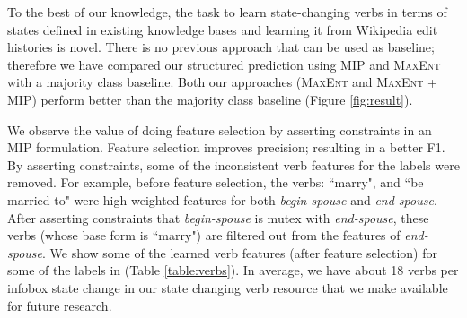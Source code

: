 To the best of our knowledge, the task to learn state-changing verbs in terms of states defined in existing knowledge bases and learning it from Wikipedia edit histories is novel. There is no previous approach that can be used as baseline; therefore we have compared our structured prediction using MIP and \textsc{MaxEnt} with a majority class baseline. Both our approaches (\textsc{MaxEnt} and \textsc{MaxEnt} + MIP) perform better than the majority class baseline (Figure \ref{fig:result}). 

We observe the value of doing feature selection by asserting constraints in an MIP formulation. Feature selection improves precision; resulting in a better F1. By asserting constraints, some of the  inconsistent verb features for the labels were removed. For example, before feature selection, the verbs: ``marry", and ``be married to" were high-weighted features for both \textit{begin-spouse} and \textit{end-spouse}. After asserting constraints that \textit{begin-spouse} is mutex with \textit{end-spouse}, these verbs (whose base form is ``marry") are filtered out from the features of \textit{end-spouse}. We show some of the learned verb features (after feature selection) for some of the labels in (Table \ref{table:verbs}). In average, we have about 18 verbs per infobox state change in our state changing verb resource that we make available for future research. 



